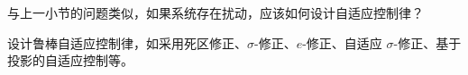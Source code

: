 





\begin{problem}
    与上一小节的问题类似，如果系统存在扰动，应该如何设计自适应控制律？
\end{problem}
\begin{hint}
    设计鲁棒自适应控制律，如采用死区修正、$\sigma$-修正、$e$-修正、自适应 $\sigma$-修正、基于投影的自适应控制等。
\end{hint}
